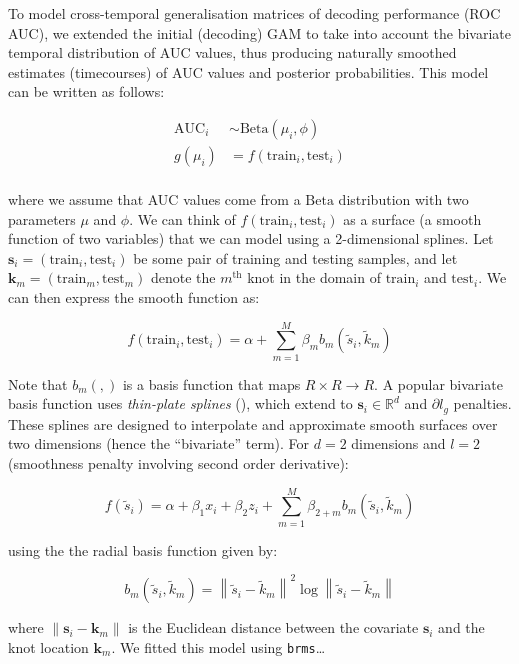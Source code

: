 \documentclass[
  doc,
  floatsintext,
  longtable,
  a4paper,
  nolmodern,
  notxfonts,
  notimes,
  donotrepeattitle,
  colorlinks=true,linkcolor=blue,citecolor=blue,urlcolor=blue]{apa7}
\begin{document}
To model cross-temporal generalisation matrices of decoding performance
(ROC AUC), we extended the initial (decoding) GAM to take into account
the bivariate temporal distribution of AUC values, thus producing
naturally smoothed estimates (timecourses) of AUC values and posterior
probabilities. This model can be written as follows:

\[
\begin{aligned}
\text{AUC}_{i} &\sim \mathrm{Beta}(\mu_{i}, \phi)\\
g(\mu_{i}) &= f \left(\text{train}_{i}, \text{test}_{i} \right)\\
\end{aligned}
\]

where we assume that AUC values come from a \(\mathrm{Beta}\)
distribution with two parameters \(\mu\) and \(\phi\). We can think of
\(f \left(\text{train}_{i}, \text{test}_{i} \right)\) as a surface (a
smooth function of two variables) that we can model using a
2-dimensional splines. Let
\(\mathbf{s}_{i} = \left(\text{train}_{i}, \text{test}_{i} \right)\) be
some pair of training and testing samples, and let
\(\mathbf{k}_{m} = \left(\text{train}_{m}, \text{test}_{m} \right)\)
denote the \(m^{\text{th}}\) knot in the domain of \(\text{train}_{i}\)
and \(\text{test}_{i}\). We can then express the smooth function as:

\[
f \left(\text{train}_{i}, \text{test}_{i} \right) = \alpha + \sum_{m=1}^M \beta_{m} b_{m} \left(\tilde{s}_{i}, \tilde{k}_{m} \right)
\]

Note that \(b_{m}(,)\) is a basis function that maps
\(R \times R \rightarrow R\). A popular bivariate basis function uses
\emph{thin-plate splines} (), which
extend to \(\mathbf{s}_{i} \in \mathbb{R}^{d}\) and \(\partial l_{g}\)
penalties. These splines are designed to interpolate and approximate
smooth surfaces over two dimensions (hence the ``bivariate'' term). For
\(d=2\) dimensions and \(l=2\) (smoothness penalty involving second
order derivative):

\[
f \left(\tilde{s}_{i} \right) = \alpha + \beta_{1} x_{i} + \beta_{2} z_{i} +\sum_{m=1}^{M} \beta_{2+m} b_m\left(\tilde{s}_i, \tilde{k}_m\right)
\]

using the the radial basis function given by:

\[
b_m\left(\tilde{s}_i, \tilde{k}_m\right)=\left\|\tilde{s}_i-\tilde{k}_m\right\|^2 \log \left\|\tilde{s}_i-\tilde{k}_m\right\|
\]

where \(\left\|\mathbf{s}_i-\mathbf{k}_{m}\right\|\) is the Euclidean
distance between the covariate \(\mathbf{s}_{i}\) and the knot location
\(\mathbf{k}_{m}\). We fitted this model using \texttt{brms}\ldots{}
\end{document}
